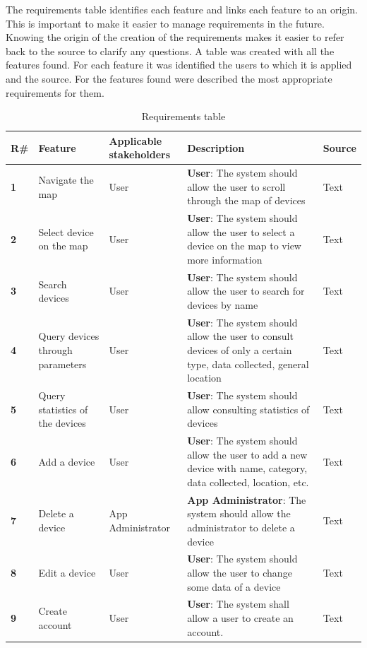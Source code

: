 \documentclass{scrreprt}
\begin{document}
The requirements table identifies each feature and links each feature to an origin.
\newline
This is important to make it easier to manage requirements in the future.
Knowing the origin of the creation of the requirements makes it easier to
refer back to the source to clarify any questions.
\newline
A table was created with all the features found. For each feature it was identified
the users to which it is applied and the source.
\newline
For the features found were described the most appropriate requirements for
them. \\
\begin{table}[H]
    \centering
    \begin{adjustbox}{width=1.2\textwidth,center=\textwidth}
    \begin{tabular}{|l|p{}|p{}|p{}|p{}|}
        \hline
        \rowcolor{green!20}
        \textbf{R\#} & \textbf{Feature} & \textbf{Applicable stakeholders} & \textbf{Description} & \textbf{Source} \\
        \hline
        \textbf{1} & Navigate the map & User & \textbf{User}: The system should allow the user to scroll through the map of devices & Text \\
        \hline
        \textbf{2} & Select device on the map & User & \textbf{User}: The system should allow the user to select a device on the map to view more information & Text \\
        \hline
        \textbf{3} & Search devices & User & \textbf{User}: The system should allow the user to search for devices by name & Text \\
        \hline
        \textbf{4} & Query devices through parameters & User & \textbf{User}: The system should allow the user to consult devices of only a certain type, data collected, general location & Text \\
        \hline
        \textbf{5} & Query statistics of the devices & User & \textbf{User}: The system should allow consulting statistics of devices & Text \\
        \hline
        \textbf{6} & Add a device & User & \textbf{User}: The system should allow the user to add a new device with name, category, data collected, location, etc. & Text \\
        \hline
        \textbf{7} & Delete a device & App Administrator & \textbf{App Administrator}: The system should allow the administrator to delete a device & Text \\
        \hline
        \textbf{8} & Edit a device & User & \textbf{User}: The system should allow the user to change some data of a device & Text \\
        \hline
        \textbf{9} & Create account & User & \textbf{User}: The system shall allow a user to create an account. & Text \\
        \hline
    \end{tabular}
    \end{adjustbox}
    \caption{Requirements table}
    \label{table:table1}
\end{table}
\end{document}
